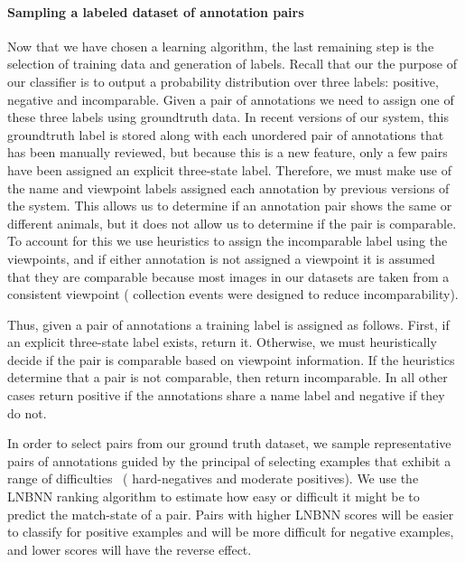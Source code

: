     \paragraph{Sampling a labeled dataset of annotation pairs}
    Now that we have chosen a learning algorithm, the last remaining step is the selection of training data and
      generation of labels.
    Recall that our the purpose of our classifier is to output a probability distribution over three labels:
    positive, negative and incomparable.
    Given a pair of annotations we need to assign one of these three labels using groundtruth data.
    In recent versions of our system, this groundtruth label is stored along with each unordered pair of
      annotations that has been manually reviewed, but because this is a new feature, only a few pairs have been
      assigned an explicit three-state label.
    Therefore, we must make use of the name and viewpoint labels assigned each annotation by previous versions of
      the system.
    This allows us to determine if an annotation pair shows the same or different animals, but it does not allow
      us to determine if the pair is comparable.
    To account for this we use heuristics to assign the incomparable label using the viewpoints, and if either
      annotation is not assigned a viewpoint it is assumed that they are comparable because most images in our
      datasets are taken from a consistent viewpoint (\ie{} collection events were designed to reduce
      incomparability).

    Thus, given a pair of annotations a training label is assigned as follows.
    First, if an explicit three-state label exists, return it.
    Otherwise, we must heuristically decide if the pair is comparable based on viewpoint information.
    If the heuristics determine that a pair is not comparable, then return incomparable.
    In all other cases return positive if the annotations share a name label and negative if they do not.

    In order to select pairs from our ground truth dataset, we sample representative pairs of annotations guided
      by the principal of selecting examples that exhibit a range of difficulties~\cite{shi_embedding_2016} (\eg
      hard-negatives and moderate positives).
    We use the LNBNN ranking algorithm to estimate how easy or difficult it might be to predict the match-state
      of a pair.
    Pairs with higher LNBNN scores will be easier to classify for positive examples and will be more difficult
      for negative examples, and lower scores will have the reverse effect.

